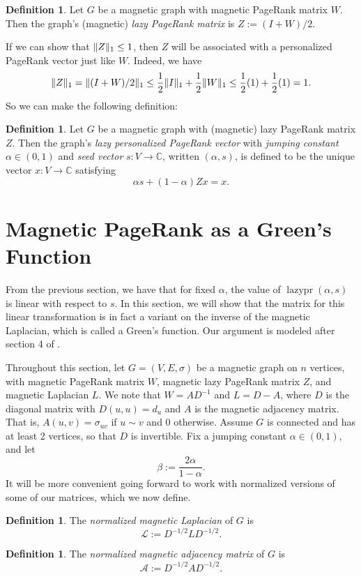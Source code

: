 \documentclass{article}
\theoremstyle{definition}
\newtheorem{defn}[thm]{Definition}
\newcommand{\C}{\mathbb C}
\DeclarePairedDelimiter\norm{\lVert}{\rVert}
\DeclareMathOperator{\lazypr}{lazypr}
\newcommand{\lap}{\mathcal{L}}
\newcommand{\normadj}{\mathcal{A}}
\begin{document}
\begin{defn}
Let $G$ be a magnetic graph with magnetic PageRank matrix $W$. Then the graph's (magnetic) \textit{lazy PageRank matrix} is $Z := (I + W)/2$.
\end{defn}

If we can show that $\norm{Z}_1 \leq 1$, then $Z$ will be associated with a personalized PageRank vector just like $W$. Indeed, we have
$$
\norm{Z}_1 = \norm{(I+W)/2}_1 
\leq \frac{1}{2} \norm{I}_1 + \frac{1}{2} \norm{W}_1 
\leq \frac{1}{2} (1) + \frac{1}{2} (1) 
= 1.
$$
So we can make the following definition:

\begin{defn}
Let $G$ be a magnetic graph with (magnetic) lazy PageRank matrix $Z$. Then the graph's \textit{lazy personalized PageRank vector} with \textit{jumping constant} $\alpha \in (0, 1)$ and \textit{seed vector} $s: V \rightarrow \C$, written \lazypr$(\alpha, s)$, is defined to be the unique vector $x: V \rightarrow \C$ satisfying
$$
\alpha s + (1 - \alpha) Z x = x.
$$
\end{defn}

\section{Magnetic PageRank as a Green's Function}

From the previous section, we have that for fixed $\alpha$, the value of $\lazypr(\alpha, s)$ is linear with respect to $s$. In this section, we will show that the matrix for this linear transformation is in fact a variant on the inverse of the magnetic Laplacian, which is called a Green's function. Our argument is modeled after section 4 of \cite{pagerankgreen}. 

Throughout this section, let $G=(V, E, \sigma)$ be a magnetic graph on $n$ vertices, with magnetic PageRank matrix $W$, magnetic lazy PageRank matrix $Z$, and magnetic Laplacian $L$. We note that $W = A D^{-1}$ and $L = D - A$, where $D$ is the diagonal matrix with $D(u, u) = d_u$ and $A$ is the magnetic adjacency matrix. That is, $A(u, v) = \sigma_{uv}$ if $u \sim v$ and 0 otherwise. Assume $G$ is connected and has at least 2 vertices, so that $D$ is invertible. Fix a jumping constant $\alpha \in (0, 1)$, and let $$\beta := \frac{2 \alpha}{1 - \alpha}.$$
It will be more convenient going forward to work with normalized versions of some of our matrices, which we now define.

\begin{defn} 
The \textit{normalized magnetic Laplacian} of $G$ is
$$
\lap := D^{-1/2} L D^{-1/2}. 
$$
\end{defn}
\begin{defn}
The \textit{normalized magnetic adjacency matrix} of $G$ is
$$
\normadj := D^{-1/2} A D^{-1/2}. 
$$
\end{defn}
\end{document}
